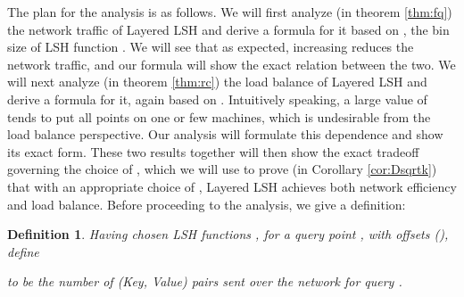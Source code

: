 \documentclass{acm_proc_article-sp}
\numberwithin{equation}{section}
\numberwithin{figure}{section}
\newtheorem{defn}[thm]{Definition}
\begin{document}
The plan for the analysis is as follows. We will first analyze (in theorem \ref{thm:fq}) the network traffic of Layered LSH and derive a formula for it based on , the bin size of LSH function . We will see that as expected, increasing  reduces the network traffic, and our formula will show the exact relation between the two. We will next analyze (in theorem \ref{thm:rc}) the load balance of Layered LSH and derive a formula for it, again based on . Intuitively speaking, a large value of  tends to put all points on one or few machines, which is undesirable from the load balance perspective. Our analysis will formulate this dependence and show its exact form. These two results together will then show the exact tradeoff governing the choice of , which we will use to prove (in Corollary \ref{cor:Dsqrtk}) that with an appropriate choice of , Layered LSH achieves both network efficiency and load balance. Before proceeding to the analysis, we give a definition:
\begin{defn}
\label{defn:f} Having chosen LSH functions , for a query point , with offsets  (), define

to be the number of (Key, Value) pairs sent over the network for query .
\end{defn}
\end{document}
